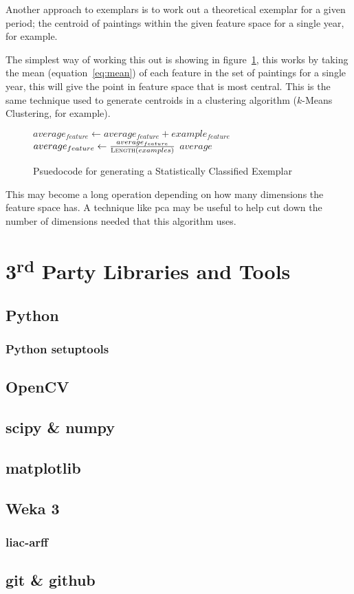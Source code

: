 Another approach to exemplars is to work out a theoretical exemplar for a given period; the 
centroid of paintings within the given feature space for a single year, for example.

The simplest way of working this out is showing in figure~\ref{fig:sce-psuedo}, this works by 
taking the mean (equation~\ref{eq:mean}) of each feature in the set of paintings for a single 
year, this will give the point in feature space that is most central. This is the same technique
used to generate centroids in a clustering algorithm ($k$-Means Clustering, for example).

\begin{figure}[h]
\begin{algorithmic}
\State $average_{feature} \gets average_{feature} + example_{feature}$
\EndFor
\EndFor
{}
\State$average_{feature} \gets \frac{average_{feature}}{\Call{Length}{examples}}$
\EndFor
\State \Return $average$
\EndFunction
\end{algorithmic}
\caption{Psuedocode for generating a Statistically Classified Exemplar}\label{fig:sce-psuedo}
\end{figure}

This may become a long operation depending on how many dimensions the feature space has. A
technique like \gls{pca} may be useful to help cut down the number of dimensions needed that this
algorithm uses.


\section{3\textsuperscript{rd} Party Libraries and Tools}

\subsection{Python}
\subsubsection{Python setuptools}

\subsection{OpenCV}

\subsection{scipy \& numpy}

\subsection{matplotlib}

\subsection{Weka 3}
\subsubsection{liac-arff}

\subsection{git \& github}



